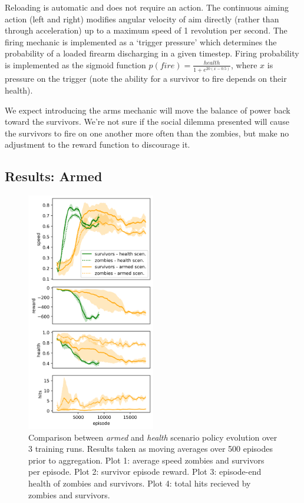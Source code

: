 \documentclass[11pt,a4paper]{article}
\begin{document}
Reloading is automatic and does not require an action.
The continuous aiming action (left and right) modifies angular velocity of aim directly (rather than through acceleration) up to a maximum speed of 1 revolution per second.
The firing mechanic is implemented as a `trigger pressure' which determines the probability of a loaded firearm discharging in a given timestep.
Firing probability is implemented as the sigmoid function $p(fire) = \frac{health}{1+e^{20(x-0.5)}}$, where $x$ is pressure on the trigger (note the ability for a survivor to fire depends on their health).

We expect introducing the arms mechanic will move the balance of power back toward the survivors.
We're not sure if the social dilemma presented will cause the survivors to fire on one another more often than the zombies,
but make no adjustment to the reward function to discourage it.

\subsection{Results: Armed}

\begin{figure}
  \centering
  \includegraphics[width=0.5\textwidth]{figures/armed_health_compare.png}
  \caption{
    Comparison between \emph{armed} and \emph{health} scenario policy evolution over 3 training runs.
    Results taken as moving averages over 500 episodes prior to aggregation.
    Plot 1: average speed zombies and survivors per episode.
    Plot 2: survivor episode reward.
    Plot 3: episode-end health of zombies and survivors.
    Plot 4: total hits recieved by zombies and survivors.
  }
  \label{fig:armed_health_compare}
\end{figure}
\end{document}
